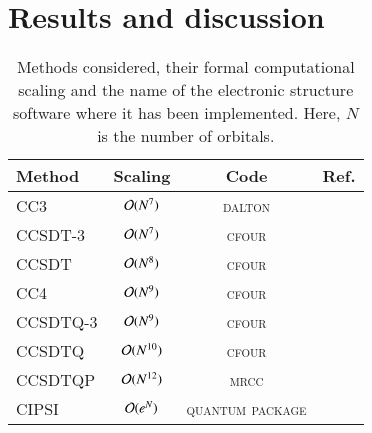 \documentclass[aip,jcp,reprint,noshowkeys,superscriptaddress]{revtex4-1}
\newcommand{\QP}{\textsc{quantum package}}
\newcommand{\MRCC}{\textsc{mrcc}}
\newcommand{\CFOUR}{\textsc{cfour}}
\newcommand{\DALTON}{\textsc{dalton}}
\begin{document}
\section{Results and discussion}

\begin{table}
	\caption{Methods considered, their formal computational scaling and the name of the electronic structure software where it has been implemented.
	Here, $N$ is the number of orbitals.
	\label{tab:scaling}}
	\begin{ruledtabular}
	\begin{tabular}{lccc}
		Method	&	Scaling					&	Code		&	Ref.					\\
		\hline
		CC3			&	$\order*{N^{7}}$	&	\DALTON		&	\onlinecite{dalton}		\\
		CCSDT-3		&	$\order*{N^{7}}$	&	\CFOUR		&	\onlinecite{cfour}		\\
		CCSDT		&	$\order*{N^{8}}$	&	\CFOUR		&	\onlinecite{cfour}		\\
		CC4			&	$\order*{N^{9}}$	&	\CFOUR		&	\onlinecite{cfour}		\\
		CCSDTQ-3	&	$\order*{N^{9}}$	&	\CFOUR		&	\onlinecite{cfour}		\\
		CCSDTQ		&	$\order*{N^{10}}$	&	\CFOUR		&	\onlinecite{cfour}		\\
		CCSDTQP		&	$\order*{N^{12}}$	&	\MRCC		&	\onlinecite{mrcc}		\\	
		CIPSI		&	$\order*{e^{N}}$	&	\QP			&	\onlinecite{qp2}		\\
	\end{tabular}
	\end{ruledtabular}
\end{table}
\end{document}
